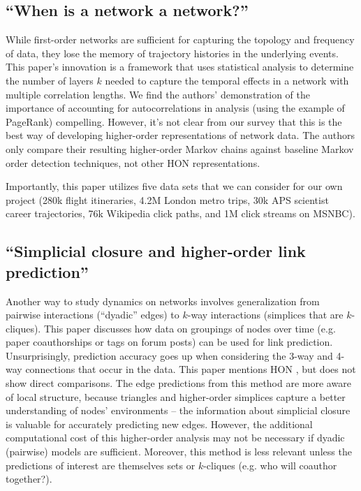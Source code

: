 \documentclass[sigconf]{acmart}
\begin{document}
\subsection{``When is a network a network?'' \cite{Scholtes2017}} \label{paper:wianan}
While first-order networks are sufficient for capturing the topology and frequency of data, they lose the memory of trajectory histories in the underlying events. This paper's innovation is a framework that uses statistical analysis to determine the number of layers $k$ needed to capture the temporal effects in a network with multiple correlation lengths. We find the authors' demonstration of the importance of accounting for autocorrelations in analysis (using the example of PageRank) compelling. 
However, it's not clear from our survey that this is the best way of developing higher-order representations of network data. The authors only compare their resulting higher-order Markov chains against baseline Markov order detection techniques, not other HON representations.

Importantly, this paper utilizes five data sets that we can consider for our own project (280k flight itineraries, 4.2M London metro trips, 30k APS scientist career trajectories, 76k Wikipedia click paths, and 1M click streams on MSNBC).

\subsection{``Simplicial closure and higher-order link prediction'' \cite{Benson2018}}
Another way to study dynamics on networks involves generalization from pairwise interactions (``dyadic'' edges) to $k$-way interactions (simplices that are $k$-cliques). This paper discusses how data on groupings of nodes over time (e.g. paper coauthorships or tags on forum posts) can be used for link prediction. Unsurprisingly, prediction accuracy goes up when considering the 3-way and 4-way connections that occur in the data. This paper mentions HON \cite{Xu2016}, but does not show direct comparisons. The edge predictions from this method are more aware of local structure, because triangles and higher-order simplices capture a better understanding of nodes' environments -- the information about simplicial closure is valuable for accurately predicting new edges. However, the additional computational cost of this higher-order analysis may not be necessary if dyadic (pairwise) models are sufficient. Moreover, this method is less relevant unless the predictions of interest are themselves sets or $k$-cliques (e.g. who will coauthor together?).
\end{document}
